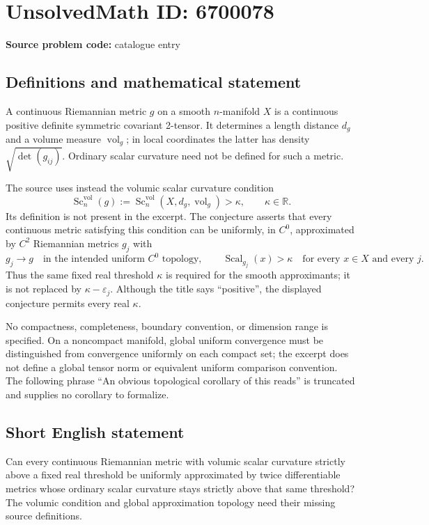 \documentclass[11pt]{article}
\newcommand{\R}{\mathbb{R}}
\begin{document}
\section*{UnsolvedMath ID: 6700078}
\textbf{Source problem code:} catalogue entry
\subsection{Definitions and mathematical statement}
A continuous Riemannian metric \(g\) on a smooth \(n\)-manifold \(X\) is a continuous positive definite symmetric covariant 2-tensor. It determines a length distance \(d_g\) and a volume measure \(\operatorname{vol}_g\); in local coordinates the latter has density \(\sqrt{\det(g_{ij})}\). Ordinary scalar curvature need not be defined for such a metric.

The source uses instead the volumic scalar curvature condition
\[
 \operatorname{Sc}^{\mathrm{vol}}_n(g)
 :=\operatorname{Sc}^{\mathrm{vol}}_n(X,d_g,\operatorname{vol}_g)>\kappa,
 \qquad \kappa\in\R.
\]
Its definition is not present in the excerpt. The conjecture asserts that every continuous metric satisfying this condition can be uniformly, in \(C^0\), approximated by \(C^2\) Riemannian metrics \(g_j\) with
\[
 g_j\longrightarrow g\quad\text{in the intended uniform }C^0\text{ topology},\qquad
 \operatorname{Scal}_{g_j}(x)>\kappa\quad\text{for every }x\in X\text{ and every }j.
\]
Thus the same fixed real threshold \(\kappa\) is required for the smooth approximants; it is not replaced by \(\kappa-\varepsilon_j\). Although the title says ``positive'', the displayed conjecture permits every real \(\kappa\).

No compactness, completeness, boundary convention, or dimension range is specified. On a noncompact manifold, global uniform convergence must be distinguished from convergence uniformly on each compact set; the excerpt does not define a global tensor norm or equivalent uniform comparison convention. The following phrase ``An obvious topological corollary of this reads'' is truncated and supplies no corollary to formalize.
\subsection{Short English statement}
Can every continuous Riemannian metric with volumic scalar curvature strictly above a fixed real threshold be uniformly approximated by twice differentiable metrics whose ordinary scalar curvature stays strictly above that same threshold? The volumic condition and global approximation topology need their missing source definitions.
\end{document}
